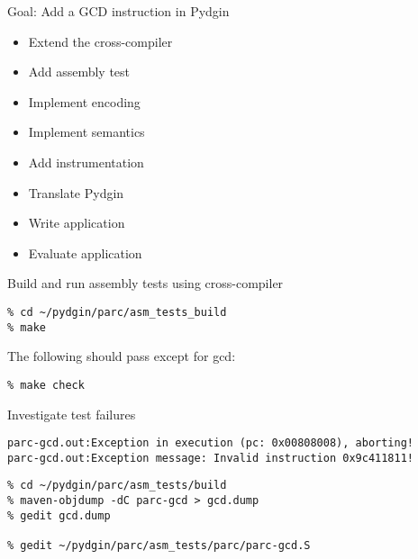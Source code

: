 \begin{frame}{Goal: Add a GCD instruction in Pydgin}

\begin{itemize}
  \item Extend the cross-compiler
  \item Add assembly test
  \item Implement encoding
  \item Implement semantics
  \item Add instrumentation
  \item Translate Pydgin
  \item Write application
  \item Evaluate application
\end{itemize}

\end{frame}


\begin{task}
\begin{frame}[fragile]{Build and run assembly tests using cross-compiler}

\begin{verbatim}
% cd ~/pydgin/parc/asm_tests_build
% make
\end{verbatim}

The following should pass except for gcd:

\begin{verbatim}
% make check
\end{verbatim}

\end{frame}
\end{task}


\begin{task}
\begin{frame}[fragile]{Investigate test failures}

\begin{verbatim}
parc-gcd.out:Exception in execution (pc: 0x00808008), aborting!
parc-gcd.out:Exception message: Invalid instruction 0x9c411811!
\end{verbatim}

\begin{verbatim}
% cd ~/pydgin/parc/asm_tests/build
% maven-objdump -dC parc-gcd > gcd.dump
% gedit gcd.dump

% gedit ~/pydgin/parc/asm_tests/parc/parc-gcd.S
\end{verbatim}

\end{frame}
\end{task}

